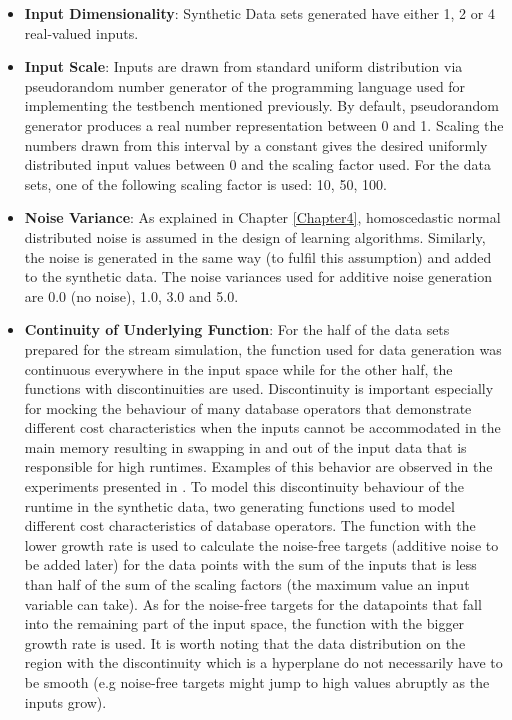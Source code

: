 \begin{itemize}
\item \textbf{Input Dimensionality}: Synthetic Data sets generated have either 1, 2 or 4 real-valued inputs.
\item \textbf{Input Scale}: Inputs are drawn from standard uniform distribution via pseudorandom number generator of the programming language used for implementing the testbench mentioned previously. By default, pseudorandom generator produces a real number representation between 0 and 1. Scaling the numbers drawn from this interval by a constant gives the desired uniformly distributed input values between 0 and the scaling factor used. For the data sets, one of the following scaling factor is used: 10, 50, 100.
\item \textbf{Noise Variance}: As explained in Chapter \ref{Chapter4}, homoscedastic normal distributed noise is assumed in the design of learning algorithms. Similarly, the noise is generated in the same way (to fulfil this assumption) and added to the synthetic data. The noise variances used for additive noise generation are 0.0 (no noise), 1.0, 3.0 and 5.0.
\item \textbf{Continuity of Underlying Function}: For the half of the data sets prepared for the stream simulation, the function used for data generation was continuous everywhere in the input space while for the other half, the functions with discontinuities are used. Discontinuity is important especially for mocking the behaviour of many database operators that demonstrate different cost characteristics when the inputs cannot be accommodated in the main memory resulting in swapping in and out of the input data that is responsible for high runtimes. Examples of this behavior are observed in the experiments presented in \cite[p. 717]{heimel_hardware-oblivious_2013}. To model this discontinuity behaviour of the runtime in the synthetic data,  two generating functions used to model different cost characteristics of database operators. The function with the lower growth rate is used to calculate the noise-free targets (additive noise to be added later) for the data points with the sum of the inputs that is less than half of the sum of the scaling factors (the maximum value an input variable can take). As for the noise-free targets for the datapoints that fall into the remaining part of the input space, the function with the bigger growth rate is used. It is worth noting that the data distribution on the region with the discontinuity which is a hyperplane do not necessarily have to be smooth (e.g noise-free targets might jump to high values abruptly as the inputs grow).

\end{itemize}
